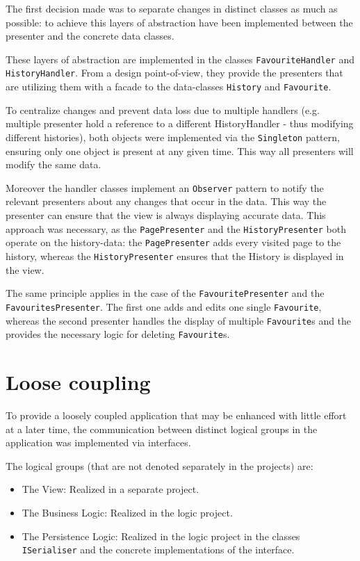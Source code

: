 The first decision made was to separate changes in distinct classes as much as possible: to achieve this layers of abstraction have been implemented between the presenter and the concrete data classes.

These layers of abstraction are implemented in the classes \texttt{FavouriteHandler} and \texttt{HistoryHandler}.
From a design point-of-view, they provide the presenters that are utilizing them with a facade to the data-classes \texttt{History} and \texttt{Favourite}.

To centralize changes and prevent data loss due to multiple handlers (e.g. multiple presenter hold a reference to a different HistoryHandler - thus modifying different histories), both objects were implemented via the \texttt{Singleton} pattern, ensuring only one object is present at any given time. This way all presenters will modify the same data.

Moreover the handler classes implement an \texttt{Observer} pattern to notify the relevant presenters about any changes that occur in the data. 
This way the presenter can ensure that the view is always displaying accurate data. 
This approach was necessary, as the \texttt{PagePresenter} and the \texttt{HistoryPresenter} both operate on the history-data: the \texttt{PagePresenter} adds every visited page to the history, whereas the \texttt{HistoryPresenter} ensures that the History is displayed in the view.

The same principle applies in the case of the \texttt{FavouritePresenter} and the \texttt{FavouritesPresenter}. The first one adds and edits one single \texttt{Favourite}, whereas the second presenter handles the display of multiple \texttt{Favourite}s and the provides the necessary logic for deleting \texttt{Favourite}s.

\section{Loose coupling}
\label{subsec:loose_coupling}

To provide a loosely coupled application that may be enhanced with little effort at a later time, the communication between distinct logical groups in the application was implemented via interfaces.

The logical groups (that are not denoted separately in the projects) are:

\begin{itemize}
\item The View: Realized in a separate project.
\item The Business Logic: Realized in the logic project.
\item The Persistence Logic: Realized in the logic project in the classes \texttt{ISerialiser} and the concrete implementations of the interface.
\end{itemize}

